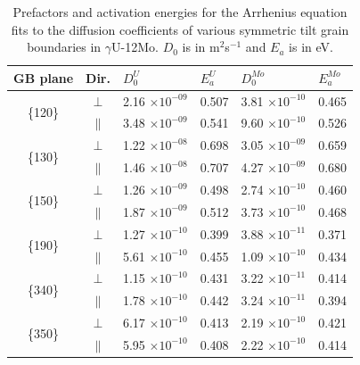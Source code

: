 \documentclass{elsarticle}
\begin{document}
\begin{appendices}
\begin{table}[!ht]
\centering
\caption{Prefactors and activation energies for the Arrhenius equation fits to the diffusion coefficients of various symmetric tilt grain boundaries in $\gamma$U-12Mo. $D_0$ is in m$^2$s$^{-1}$ and $E_a$ is in eV.}
\label{tab:u12mo}
\begin{tabular}{ccllll}
\toprule
GB plane & Dir.
	& $D_{0}^U$      & $E_{a}^U$
	& $D_{0}^{Mo}$   & $E_{a}^{Mo}$ \\
\midrule
\multirow{2}{*}{ \{120\} }
	& $\perp$
	& 2.16 $\times 10^{-09}$ & 0.507
	& 3.81 $\times 10^{-10}$ & 0.465 \\
	& $\parallel$
	& 3.48 $\times 10^{-09}$ & 0.541
	& 9.60 $\times 10^{-10}$ & 0.526 \vspace{0.2cm } \\
\multirow{2}{*}{ \{130\} }
	& $\perp$
	& 1.22 $\times 10^{-08}$ & 0.698
	& 3.05 $\times 10^{-09}$ & 0.659 \\
	& $\parallel$
	& 1.46 $\times 10^{-08}$ & 0.707
	& 4.27 $\times 10^{-09}$ & 0.680 \vspace{0.2cm } \\
\multirow{2}{*}{ \{150\} }
	& $\perp$
	& 1.26 $\times 10^{-09}$ & 0.498
	& 2.74 $\times 10^{-10}$ & 0.460 \\
	& $\parallel$
	& 1.87 $\times 10^{-09}$ & 0.512
	& 3.73 $\times 10^{-10}$ & 0.468 \vspace{0.2cm } \\
\multirow{2}{*}{ \{190\} }
	& $\perp$
	& 1.27 $\times 10^{-10}$ & 0.399
	& 3.88 $\times 10^{-11}$ & 0.371 \\
	& $\parallel$
	& 5.61 $\times 10^{-10}$ & 0.455
	& 1.09 $\times 10^{-10}$ & 0.434 \vspace{0.2cm } \\
\multirow{2}{*}{ \{340\} }
	& $\perp$
	& 1.15 $\times 10^{-10}$ & 0.431
	& 3.22 $\times 10^{-11}$ & 0.414 \\
	& $\parallel$
	& 1.78 $\times 10^{-10}$ & 0.442
	& 3.24 $\times 10^{-11}$ & 0.394 \vspace{0.2cm } \\
\multirow{2}{*}{ \{350\} }
	& $\perp$
	& 6.17 $\times 10^{-10}$ & 0.413
	& 2.19 $\times 10^{-10}$ & 0.421 \\
	& $\parallel$
	& 5.95 $\times 10^{-10}$ & 0.408
	& 2.22 $\times 10^{-10}$ & 0.414 \\
\bottomrule
\end{tabular}
\end{table}

\FloatBarrier

\end{appendices}
\end{document}
